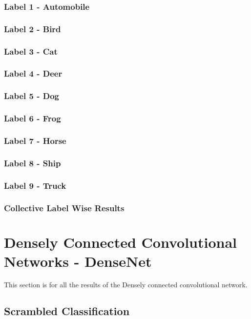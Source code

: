 \subsubsection{Label 1 - Automobile}
\subsubsection{Label 2 - Bird}
\subsubsection{Label 3 - Cat}
\subsubsection{Label 4 - Deer}
\subsubsection{Label 5 - Dog}
\subsubsection{Label 6 - Frog}
\subsubsection{Label 7 - Horse}
\subsubsection{Label 8 - Ship}
\subsubsection{Label 9 - Truck}
\subsubsection{Collective Label Wise Results}

\section{Densely Connected Convolutional Networks - DenseNet}
This section is for all the results of the Densely connected convolutional network.

\subsection{Scrambled Classification}

\FloatBarrier

